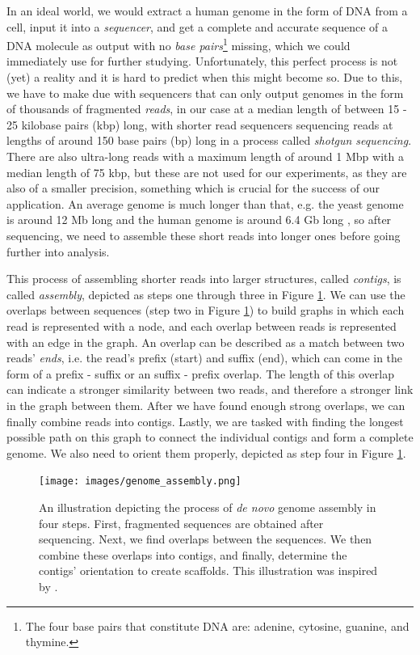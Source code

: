 \documentclass[times, utf8, diplomski, english]{fer_eng}
\begin{document}
In an ideal world, we would extract a human genome in the form of DNA from a cell, input it into a \textit{sequencer}, and get a complete and accurate sequence of a DNA molecule as output with no \textit{base pairs}\footnote{The four base pairs that constitute DNA are: adenine, cytosine, guanine, and thymine.} missing, which we could immediately use for further studying. Unfortunately, this perfect process is not (yet) a reality and it is hard to predict when this might become so. Due to this, we have to make due with sequencers that can only output genomes in the form of thousands of fragmented \textit{reads}, in our case at a median length of between 15 - 25 kilobase pairs (kbp) long, with shorter read sequencers sequencing reads at lengths of around 150 base pairs (bp) long in a process called \textit{shotgun sequencing}. There are also ultra-long reads with a maximum length of around 1 Mbp with a median length of 75 kbp, but these are not used for our experiments, as they are also of a smaller precision, something which is crucial for the success of our application. An average genome is much longer than that, e.g. the yeast genome is around 12 Mb long \cite{yeast} and the human genome is around 6.4 Gb long \cite{human}, so after sequencing, we need to assemble these short reads into longer ones before going further into analysis.

This process of assembling shorter reads into larger structures, called \textit{contigs}, is called \textit{assembly}, depicted as steps one through three in Figure \ref{fig:genome assembly}. We can use the overlaps between sequences (step two in Figure \ref{fig:genome assembly}) to build graphs in which each read is represented with a node, and each overlap between reads is represented with an edge in the graph. An overlap can be described as a match between two reads' \textit{ends}, i.e. the read's prefix (start) and suffix (end), which can come in the form of a prefix - suffix or an suffix - prefix overlap. The length of this overlap can indicate a stronger similarity between two reads, and therefore a stronger link in the graph between them. After we have found enough strong overlaps, we can finally combine reads into contigs. Lastly, we are tasked with finding the longest possible path on this graph to connect the individual contigs and form a complete genome. We also need to orient them properly, depicted as step four in Figure \ref{fig:genome assembly}.

\begin{figure}
	\centering
	\texttt{[image: images/genome\_assembly.png]}
	\caption[Genome assembly]{An illustration depicting the process of \textit{de novo} genome assembly in four steps. First, fragmented sequences are obtained after sequencing. Next, we find overlaps between the sequences. We then combine these overlaps into contigs, and finally, determine the contigs' orientation to create scaffolds. This illustration was inspired by \cite{baker_2012}.}
	\label{fig:genome assembly}
\end{figure}
\end{document}
